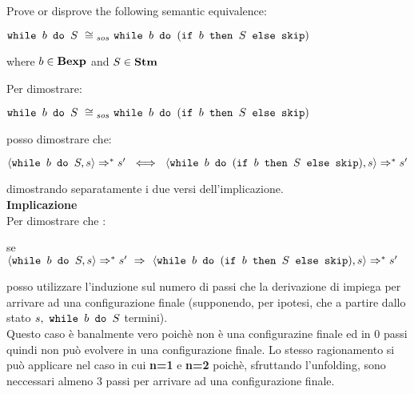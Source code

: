 \newcommand{\exFour}
{$\wbS{b}{S}~\cong{}_{sos}~\wbS{b}{(\ifABC{b}{S}{\skipistr})} $}

\newcommand{\exFourIff}
{$\confSs{\wbS{b}{S}}{s}\Rar{*}s'~\iff{}~\confSs{\wbS{b}
{(\ifABC{b}{S}{\skipistr})}}{s}\Rar{*}s'$}

\newcommand{\exFourLtR}
{$\confSs{\wbS{b}{S}}{s}\Rar{*}s'~\Rar{}~\confSs{\wbS{b}
{(\ifABC{b}{S}{\skipistr})}}{s}\Rar{*}s'$}

{
	Prove or disprove the following semantic equivalence:\\
	\begin{center}
	\exFour{}
	\end{center}
	where $b\in\mbox{\textbf{Bexp}}$ and $S\in\mbox{\textbf{Stm}}$
}
{
	Per dimostrare:
	\begin{center}
	\exFour{}
	\end{center}
	posso dimostrare che:
	\begin{center}
	\exFourIff{}
	\end{center}
	dimostrando separatamente i due versi dell'implicazione. \\
	
	\textbf{Implicazione \Rar{}} \\
	Per dimostrare che :
	\begin{center}
	se \exFourLtR{}
	\end{center}
	posso utilizzare l'induzione sul numero di passi che la derivazione di 
	 impiega per arrivare ad una configurazione finale 
	(supponendo, per ipotesi, che a partire dallo stato $s,~\mbox{\normalfont{\texttt{while }}} b \textrm{\normalfont{\texttt{ do }}} S$
	termini).\\
	
	 Questo caso è banalmente vero poichè 
	 non è una configurazine finale ed in 0 passi quindi
	non può evolvere in una configurazione finale. Lo stesso ragionamento si
	può applicare nel caso in cui \textbf{n=1} e \textbf{n=2} poichè,
	sfruttando l'unfolding, sono neccessari almeno 3 passi per arrivare ad una
	configurazione finale.\\
	
}
